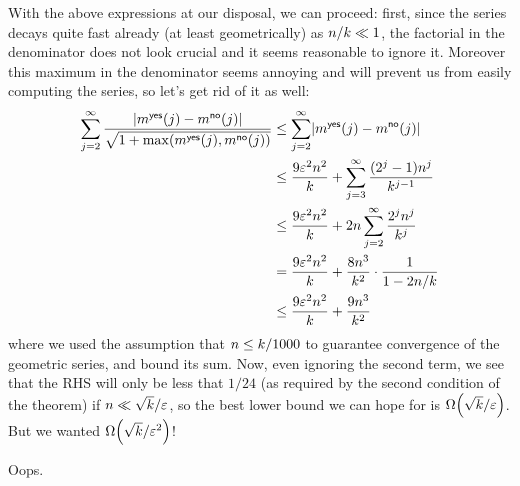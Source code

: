With the above expressions at our disposal, we can proceed: first, since the series decays quite fast already (at least geometrically) as $n/k \ll 1$, the factorial in the denominator does not look crucial and it seems reasonable to ignore it. Moreover this maximum in the denominator seems annoying and will prevent us from easily computing the series, so let's get rid of it as well:
\begin{align*}
\sum_{j=2}^\infty \frac{\abs{m^{\yes}(j)-m^{\no}(j)}}{\sqrt{1+\max(m^{\yes}(j),m^{\no}(j))}}
&\leq
\sum_{j=2}^\infty \abs{m^{\yes}(j)-m^{\no}(j)} \\
&\leq \frac{9\dst^2\ns^2}{\ab} + \sum_{j=3}^\infty \frac{(2^j-1)\ns^j}{\ab^{j-1}} \\
&\leq \frac{9\dst^2\ns^2}{\ab} + 2\ns\sum_{j=2}^\infty \frac{2^j\ns^j}{\ab^{j}} \\
&= \frac{9\dst^2\ns^2}{\ab} + \frac{8\ns^3}{\ab^2}\cdot \frac{1}{1-2\ns/\ab} \\
&\leq \frac{9\dst^2\ns^2}{\ab} + \frac{9\ns^3}{\ab^2}
\end{align*}
where we used the assumption that $n\leq k/1000$ to guarantee convergence of the geometric series, and bound its sum. Now, even ignoring the second term, we see that the RHS will only be less that $1/24$ (as required by the second condition of the theorem) if $n \ll \sqrt{k}/\varepsilon$, so the best lower bound we can hope for is $\bigOmega{\sqrt{\ab}/\dst}$. But we wanted $\bigOmega{\sqrt{\ab}/\dst^2}$!\smallskip

\noindent Oops.\smallskip

